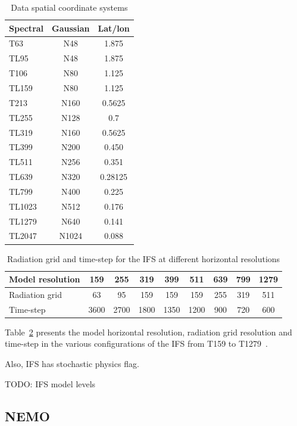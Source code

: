 \begin{table}[h!]
\centering
\begin{tabular}{|l|c|c|}
    \hline      
    Spectral  & Gaussian  & Lat/lon\\
    \hline
    T63  & N48  & 1.875\\
    TL95  & N48  & 1.875\\
    T106  & N80  & 1.125\\
    TL159  & N80  & 1.125\\
    T213  & N160  & 0.5625\\
    TL255  & N128  & 0.7\\
    TL319  & N160  & 0.5625\\
    TL399  & N200  & 0.450\\
    TL511  & N256  & 0.351\\
    TL639  & N320  & 0.28125\\
    TL799  & N400  & 0.225\\
    TL1023  & N512  & 0.176\\
    TL1279  & N640  & 0.141\\
    TL2047  & N1024  & 0.088\\  
    \hline
\end{tabular}
\caption{Data spatial coordinate systems}
\label{tab:spac-coord}
\end{table}  

\begin{table}[h!]
\centering       
\begin{tabular}{|l|c|c|c|c|c|c|c|c|}
    \hline 
    Model resolution & 159 & 255 & 319 & 399 & 511 & 639 & 799 & 1279 \\
    \hline
    Radiation grid & 63 & 95 & 159 & 159 & 159 & 255 & 319 & 511 \\
    Time-step & 3600 & 2700 & 1800 & 1350 & 1200 & 900 & 720 & 600 \\
    \hline
\end{tabular} 
\caption{Radiation grid and time-step for the IFS at different horizontal resolutions} 
\label{tab:ifs-grid}
\end{table}
Table~\ref{tab:ifs-grid} presents the model horizontal resolution, radiation grid resolution and time-step in the various configurations of the IFS from T159 to T1279~\cite{1399454274743}.


Also, IFS has stochastic physics flag. 

TODO:  IFS model levels

\subsection{NEMO}


